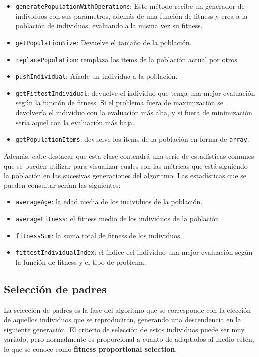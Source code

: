 \begin{itemize}
    \item \texttt{generatePopulationWithOperations}: Este método recibe un generador de individuos con sus parámetros, además de una función de fitness y crea a la población de individuos, evaluando a la misma vez su fitness.
    \item \texttt{getPopulationSize}: Devuelve el tamaño de la población.
    \item \texttt{replacePopulation}: remplaza los items de la población actual por otros.
    \item \texttt{pushIndividual}: Añade un individuo a la población.
    \item \texttt{getFittestIndividual}: devuelve el individuo que tenga una mejor evaluación según la función de fitness. Si el problema fuera de maximización se devolvería el individuo con la evaluación más alta, y si fuera de minimización sería aquel con la evaluación más baja.
    \item \texttt{getPopulationItems}: devuelve los items de la población en forma de \texttt{array}.
\end{itemize}

Ádemás, cabe destacar que esta clase contendrá una serie de estadísticas comunes que se pueden utilizar para visualizar cuales son las métricas que está siguiendo la población en las sucesivas generaciones del algoritmo. Las estadísticas que se pueden consultar serían las siguientes:

\begin{itemize}
    \item \texttt{averageAge}: la edad media de los individuos de la población.
    \item \texttt{averageFitness}: el fitness medio de los individuos de la población.
    \item \texttt{fitnessSum}: la suma total de fitness de los individuos.
    \item \texttt{fittestIndividualIndex}: el índice del individuo una mejor evaluación según la función de fitness y el tipo de problema.
\end{itemize}

\subsection{Selección de padres}

La selección de padres es la fase del algoritmo que se corresponde con la elección de aquellos individuos que se reproducirán, generando una descendencia en la siguiente generación. El criterio de selección de estos individuos puede ser muy variado, pero normalmente es proporcional a cuanto de adaptados al medio estén, lo que se conoce como \textbf{fitness proportional selection}. \\

